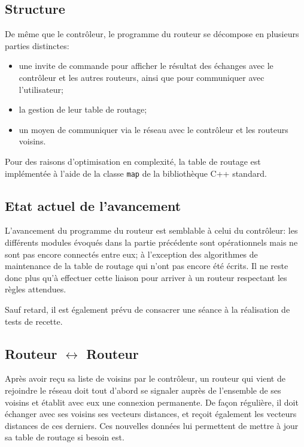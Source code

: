 \documentclass[a4paper,11pt]{article}
\begin{document}
\subsection{Structure}

De même que le contrôleur, le programme du routeur se décompose en plusieurs parties distinctes:
\begin{itemize}
\item une invite de commande pour afficher le résultat des échanges avec le contrôleur et les autres routeurs, ainsi que pour communiquer avec l'utilisateur;
\item la gestion de leur table de routage;
\item un moyen de communiquer via le réseau avec le contrôleur et les routeurs voisins.
\end{itemize}

Pour des raisons d'optimisation en complexité, la table de routage est implémentée à l'aide de la classe \texttt{map} de la bibliothèque C++ standard.

\subsection{Etat actuel de l'avancement}

L'avancement du programme du routeur est semblable à celui du contrôleur: les différents modules évoqués dans la partie précédente sont opérationnels mais ne sont pas encore connectés entre eux; à l'exception des algorithmes de maintenance de la table de routage qui n'ont pas encore été écrits. Il ne reste donc plus qu'à effectuer cette liaison pour arriver à un routeur respectant les règles attendues.

Sauf retard, il est également prévu de consacrer une séance à la réalisation de tests de recette.

\subsection{Routeur $\leftrightarrow$ Routeur}

Après avoir reçu sa liste de voisins par le contrôleur, un routeur qui vient de rejoindre le réseau doit tout d'abord se signaler auprès de l'ensemble de ses voisins et établit avec eux une connexion permanente. De façon régulière, il doit échanger avec ses voisins ses vecteurs distances, et reçoit également les vecteurs distances de ces derniers. Ces nouvelles données lui permettent de mettre à jour sa table de routage si besoin est.
\end{document}
